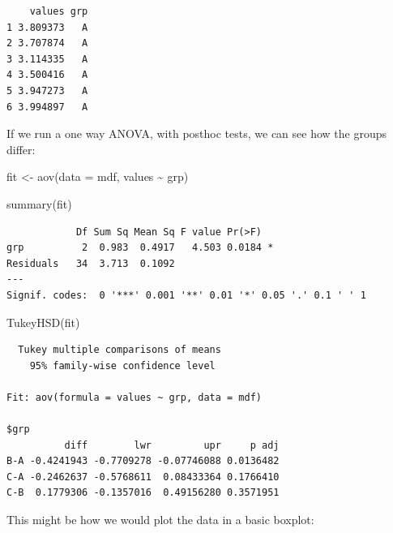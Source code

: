 \documentclass[
  letterpaper,
  DIV=11,
  numbers=noendperiod]{scrreprt}
\newenvironment{Shaded}{\begin{snugshade}}{\end{snugshade}}
\newcommand{\AttributeTok}[1]{\textcolor[rgb]{0.40,0.45,0.13}{#1}}
\newcommand{\FunctionTok}[1]{\textcolor[rgb]{0.28,0.35,0.67}{#1}}
\newcommand{\NormalTok}[1]{\textcolor[rgb]{0.00,0.23,0.31}{#1}}
\newcommand{\OtherTok}[1]{\textcolor[rgb]{0.00,0.23,0.31}{#1}}
\newcommand{\SpecialCharTok}[1]{\textcolor[rgb]{0.37,0.37,0.37}{#1}}
\begin{document}
\begin{verbatim}
    values grp
1 3.809373   A
2 3.707874   A
3 3.114335   A
4 3.500416   A
5 3.947273   A
6 3.994897   A
\end{verbatim}

If we run a one way ANOVA, with posthoc tests, we can see how the groups
differ:

\begin{Shaded}
\begin{Highlighting}[]
\NormalTok{fit }\OtherTok{\textless{}{-}} \FunctionTok{aov}\NormalTok{(}\AttributeTok{data =}\NormalTok{ mdf, values }\SpecialCharTok{\textasciitilde{}}\NormalTok{ grp)}

\FunctionTok{summary}\NormalTok{(fit)}
\end{Highlighting}
\end{Shaded}

\begin{verbatim}
            Df Sum Sq Mean Sq F value Pr(>F)  
grp          2  0.983  0.4917   4.503 0.0184 *
Residuals   34  3.713  0.1092                 
---
Signif. codes:  0 '***' 0.001 '**' 0.01 '*' 0.05 '.' 0.1 ' ' 1
\end{verbatim}

\begin{Shaded}
\begin{Highlighting}[]
\FunctionTok{TukeyHSD}\NormalTok{(fit)}
\end{Highlighting}
\end{Shaded}

\begin{verbatim}
  Tukey multiple comparisons of means
    95% family-wise confidence level

Fit: aov(formula = values ~ grp, data = mdf)

$grp
          diff        lwr         upr     p adj
B-A -0.4241943 -0.7709278 -0.07746088 0.0136482
C-A -0.2462637 -0.5768611  0.08433364 0.1766410
C-B  0.1779306 -0.1357016  0.49156280 0.3571951
\end{verbatim}

This might be how we would plot the data in a basic boxplot:
\end{document}
